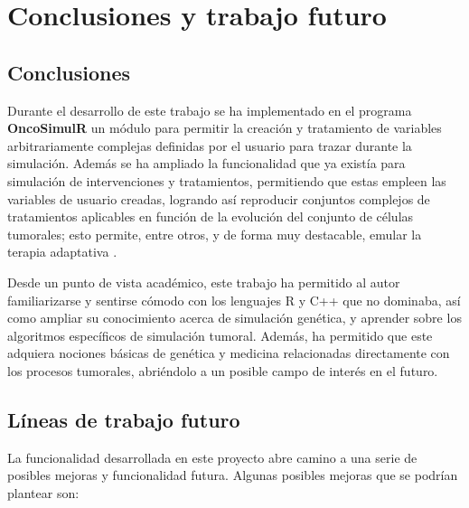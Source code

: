 \chapter{Conclusiones y trabajo futuro\label{sec:conclusiones}}\label{6}

\section{Conclusiones}\label{6.1}
Durante el desarrollo de este trabajo se ha implementado en el programa \textbf{OncoSimulR}\cite{OncoSimulR} un módulo para permitir la creación y tratamiento de variables arbitrariamente complejas definidas por el usuario para trazar durante la simulación. Además se ha ampliado la funcionalidad que ya existía para simulación de intervenciones y tratamientos, permitiendo que estas empleen las variables de usuario creadas, logrando así reproducir conjuntos complejos de tratamientos aplicables en función de la evolución del conjunto de células tumorales; esto permite, entre otros, y de forma muy destacable, emular la terapia adaptativa \cite{Hansen1}\cite{Hansen2}\cite{Hansen3}.

Desde un punto de vista académico, este trabajo ha permitido al autor familiarizarse y sentirse cómodo con los lenguajes R y C++ que no dominaba, así como ampliar su conocimiento acerca de simulación genética, y aprender sobre los algoritmos específicos de simulación tumoral. Además, ha permitido que este adquiera nociones básicas de genética y medicina relacionadas directamente con los procesos tumorales, abriéndolo a un posible campo de interés en el futuro.

\section{Líneas de trabajo futuro}\label{6.2}

La funcionalidad desarrollada en este proyecto abre camino a una serie de posibles mejoras y funcionalidad futura. Algunas posibles mejoras que se podrían plantear son:

